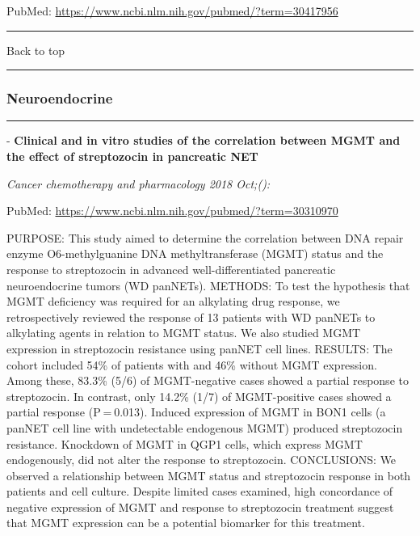 \documentclass[]{article}
\begin{document}
PubMed: \url{https://www.ncbi.nlm.nih.gov/pubmed/?term=30417956}

{}

{}

\begin{center}\rule{0.5\linewidth}{\linethickness}\end{center}

Back to top

\begin{center}\rule{0.5\linewidth}{\linethickness}\end{center}

\pagebreak

\hypertarget{neuroendocrine-2}{%
\subsubsection{Neuroendocrine}\label{neuroendocrine-2}}

\begin{center}\rule{0.5\linewidth}{\linethickness}\end{center}

 - \textbf{Clinical and in vitro studies of the correlation between MGMT
and the effect of streptozocin in pancreatic NET}

\emph{Cancer chemotherapy and pharmacology 2018 Oct;():}

PubMed: \url{https://www.ncbi.nlm.nih.gov/pubmed/?term=30310970}

PURPOSE: This study aimed to determine the correlation between DNA
repair enzyme O6-methylguanine DNA methyltransferase (MGMT) status and
the response to streptozocin in advanced well-differentiated pancreatic
neuroendocrine tumors (WD panNETs). METHODS: To test the hypothesis that
MGMT deficiency was required for an alkylating drug response, we
retrospectively reviewed the response of 13 patients with WD panNETs to
alkylating agents in relation to MGMT status. We also studied MGMT
expression in streptozocin resistance using panNET cell lines. RESULTS:
The cohort included 54\% of patients with and 46\% without MGMT
expression. Among these, 83.3\% (5/6) of MGMT-negative cases showed a
partial response to streptozocin. In contrast, only 14.2\% (1/7) of
MGMT-positive cases showed a partial response (P = 0.013). Induced
expression of MGMT in BON1 cells (a panNET cell line with undetectable
endogenous MGMT) produced streptozocin resistance. Knockdown of MGMT in
QGP1 cells, which express MGMT endogenously, did not alter the response
to streptozocin. CONCLUSIONS: We observed a relationship between MGMT
status and streptozocin response in both patients and cell culture.
Despite limited cases examined, high concordance of negative expression
of MGMT and response to streptozocin treatment suggest that MGMT
expression can be a potential biomarker for this treatment.
\end{document}
